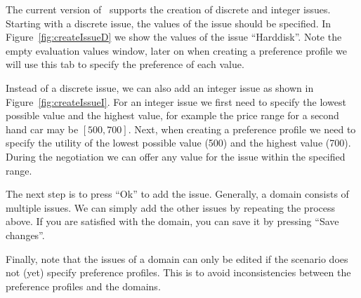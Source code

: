 \documentclass[]{article}
\begin{document}
The current version of \Genius~supports the creation of discrete and integer issues. Starting with a discrete issue, the values of the issue should be specified. In Figure~\ref{fig:createIssueD} we show the values of the issue ``Harddisk''. Note the empty evaluation values window, later on when creating a preference profile we will use this tab to specify the preference of each value.

Instead of a discrete issue, we can also add an integer issue as shown in Figure~\ref{fig:createIssueI}. For an integer issue we first need to specify the lowest possible value and the highest value, for example the price range for a second hand car may be $[500, 700]$. Next, when creating a preference profile we need to specify the utility of the lowest possible value (500) and the highest value (700). During the negotiation we can offer any value for the issue within the specified range.

The next step is to press ``Ok'' to add the issue. Generally, a domain consists of multiple issues. We can simply add the other issues by repeating the process above. If you are satisfied with the domain, you can save it by pressing  ``Save changes''.

Finally, note that the issues of a domain can only be edited if the scenario does not (yet) specify preference profiles. This is to avoid inconsistencies between the preference profiles and the domains. 
\end{document}
